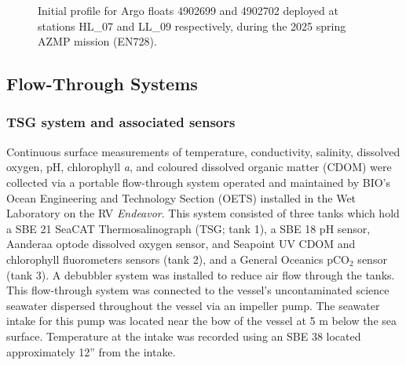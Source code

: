 \documentclass[12pt]{article}\usepackage[]{graphicx}\usepackage[]{color}
\begin{document}
\begin{figure}[htb]

{\centering {} 

}

\caption{Initial profile for Argo floats 4902699 and 4902702 deployed at stations HL_07 and LL_09 respectively, during the 2025 spring AZMP mission (EN728).}\label{fig:figure3}
\end{figure}
\clearpage

\subsection{Flow-Through Systems}\label{flow}

\subsubsection{TSG system and associated sensors}\label{tsg-system-and-associated-sensors}

Continuous surface measurements of temperature, conductivity, salinity, dissolved oxygen, pH, chlorophyll \emph{a}, and coloured dissolved organic matter (CDOM) were collected via a portable flow-through system operated and maintained by BIO's Ocean Engineering and Technology Section (OETS) installed in the Wet Laboratory on the RV \emph{Endeavor}. This system consisted of three tanks which hold a SBE 21 SeaCAT Thermosalinograph (TSG; tank 1), a SBE 18 pH sensor, Aanderaa optode dissolved oxygen sensor, and Seapoint UV CDOM and chlorophyll fluorometers sensors (tank 2), and a General Oceanics pCO\(_2\) sensor (tank 3). A debubbler system was installed to reduce air flow through the tanks. This flow-through system was connected to the vessel's uncontaminated science seawater dispersed throughout the vessel via an impeller pump. The seawater intake for this pump was located near the bow of the vessel at 5 m below the sea surface. Temperature at the intake was recorded using an SBE 38 located approximately 12'' from the intake.
\end{document}
